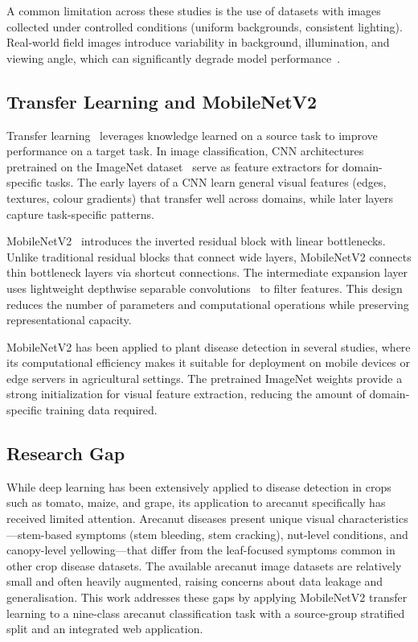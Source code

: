 \documentclass[conference]{IEEEtran}
\begin{document}
A common limitation across these studies is the use of datasets with images collected under controlled conditions (uniform backgrounds, consistent lighting). Real-world field images introduce variability in background, illumination, and viewing angle, which can significantly degrade model performance~\cite{mohanty2016}.

\subsection{Transfer Learning and MobileNetV2}

Transfer learning~\cite{pan2010} leverages knowledge learned on a source task to improve performance on a target task. In image classification, CNN architectures pretrained on the ImageNet dataset~\cite{russakovsky2015} serve as feature extractors for domain-specific tasks. The early layers of a CNN learn general visual features (edges, textures, colour gradients) that transfer well across domains, while later layers capture task-specific patterns.

MobileNetV2~\cite{sandler2018} introduces the inverted residual block with linear bottlenecks. Unlike traditional residual blocks that connect wide layers, MobileNetV2 connects thin bottleneck layers via shortcut connections. The intermediate expansion layer uses lightweight depthwise separable convolutions~\cite{howard2017} to filter features. This design reduces the number of parameters and computational operations while preserving representational capacity.

MobileNetV2 has been applied to plant disease detection in several studies, where its computational efficiency makes it suitable for deployment on mobile devices or edge servers in agricultural settings. The pretrained ImageNet weights provide a strong initialization for visual feature extraction, reducing the amount of domain-specific training data required.

\subsection{Research Gap}

While deep learning has been extensively applied to disease detection in crops such as tomato, maize, and grape, its application to arecanut specifically has received limited attention. Arecanut diseases present unique visual characteristics---stem-based symptoms (stem bleeding, stem cracking), nut-level conditions, and canopy-level yellowing---that differ from the leaf-focused symptoms common in other crop disease datasets. The available arecanut image datasets are relatively small and often heavily augmented, raising concerns about data leakage and generalisation. This work addresses these gaps by applying MobileNetV2 transfer learning to a nine-class arecanut classification task with a source-group stratified split and an integrated web application.
\end{document}
